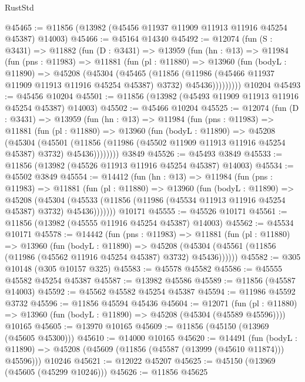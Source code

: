 \begin{lexlean}{RustStd}
\begin{coremodule}
@45465 := @11856 (@13982 (@45456 @11937 @11909 @11913 @11916 @45254 @45387) @14003)
@45466 := @45164 @14340
@45492 := @12074
    (fun (S : @3431) =>
    @11882
      (fun (D : @3431) =>
      @13959
        (fun (hn : @13) =>
        @11984
          (fun (pns : @11983) =>
          @11881
            (fun (pl : @11880) =>
            @13960
              (fun (bodyL : @11890) =>
              @45208
                (@45304
                  (@45465
                    (@11856
                      (@11986 (@45466 @11937 @11909 @11913 @11916 @45254 @45387) @3732)
                      @45436)))))))))
    @10204
@45493 := @45456 @10204
@45501 := @11856 (@13982 (@45493 @11909 @11913 @11916 @45254 @45387) @14003)
@45502 := @45466 @10204
@45525 := @12074
    (fun (D : @3431) =>
    @13959
      (fun (hn : @13) =>
      @11984
        (fun (pns : @11983) =>
        @11881
          (fun (pl : @11880) =>
          @13960
            (fun (bodyL : @11890) =>
            @45208
              (@45304
                (@45501
                  (@11856 (@11986 (@45502 @11909 @11913 @11916 @45254 @45387) @3732) @45436))))))))
    @3849
@45526 := @45493 @3849
@45533 := @11856 (@13982 (@45526 @11913 @11916 @45254 @45387) @14003)
@45534 := @45502 @3849
@45554 := @14412
    (fun (hn : @13) =>
    @11984
      (fun (pns : @11983) =>
      @11881
        (fun (pl : @11880) =>
        @13960
          (fun (bodyL : @11890) =>
          @45208
            (@45304
              (@45533 (@11856 (@11986 (@45534 @11913 @11916 @45254 @45387) @3732) @45436)))))))
    @10171
@45555 := @45526 @10171
@45561 := @11856 (@13982 (@45555 @11916 @45254 @45387) @14003)
@45562 := @45534 @10171
@45578 := @14442
    (fun (pns : @11983) =>
    @11881
      (fun (pl : @11880) =>
      @13960
        (fun (bodyL : @11890) =>
        @45208 (@45304 (@45561 (@11856 (@11986 (@45562 @11916 @45254 @45387) @3732) @45436))))))
@45582 := @305 @10148 (@305 @10157 @325)
@45583 := @45578 @45582
@45586 := @45555 @45582 @45254 @45387
@45587 := @13982 @45586
@45589 := @11856 (@45587 @14003)
@45592 := @45562 @45582 @45254 @45387
@45594 := @11986 @45592 @3732
@45596 := @11856 @45594 @45436
@45604 := @12071
    (fun (pl : @11880) => @13960 (fun (bodyL : @11890) => @45208 (@45304 (@45589 @45596))))
    @10165
@45605 := @13970 @10165
@45609 := @11856 (@45150 (@13969 (@45605 @45300)))
@45610 := @14000 @10165
@45620 := @14491
    (fun (bodyL : @11890) => @45208 (@45609 (@11856 (@45587 (@13999 (@45610 @11874))) @45596)))
    @10246
@45621 := @12022 @45207
@45625 := @45150 (@13969 (@45605 (@45299 @10246)))
@45626 := @11856 @45625

\end{coremodule}
\end{lexlean}
